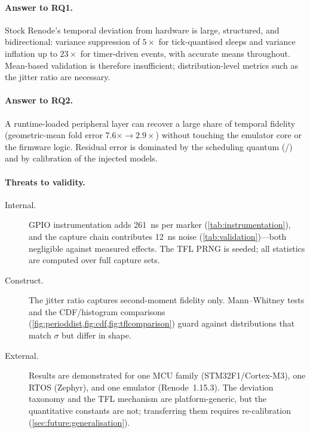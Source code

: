 \paragraph{Answer to RQ1.} Stock Renode's temporal deviation from
hardware is large, structured, and bidirectional: variance suppression
of $5\times$ for tick-quantised sleeps and variance inflation up to
$23\times$ for timer-driven events, with accurate means throughout.
Mean-based validation is therefore insufficient; distribution-level
metrics such as the jitter ratio are necessary.

\paragraph{Answer to RQ2.} A runtime-loaded peripheral layer can
recover a large share of temporal fidelity (geometric-mean fold error
$7.6\times \to 2.9\times$) without touching the emulator core or the
firmware logic. Residual error is dominated by the scheduling quantum
(/) and by calibration of the injected models.

\paragraph{Threats to validity.}
\begin{description}
  \item[Internal.] GPIO instrumentation adds \SI{261}{\nano\second}
        per marker (\cref{tab:instrumentation}), and the capture chain
        contributes \SI{12}{\nano\second} noise
        (\cref{tab:validation})---both negligible against measured
        effects. The TFL PRNG is seeded; all statistics are computed
        over full capture sets.
  \item[Construct.] The jitter ratio captures second-moment fidelity
        only. Mann--Whitney tests and the CDF/histogram comparisons
        (\cref{fig:perioddist,fig:cdf,fig:tflcomparison}) guard against
        distributions that match $\sigma$ but differ in shape.
  \item[External.] Results are demonstrated for one MCU family
        (STM32F1/Cortex-M3), one RTOS (Zephyr), and one emulator
        (Renode~1.15.3). The deviation taxonomy and the TFL mechanism
        are platform-generic, but the quantitative constants are not;
        transferring them requires re-calibration
        (\cref{sec:future:generalisation}).
\end{description}
